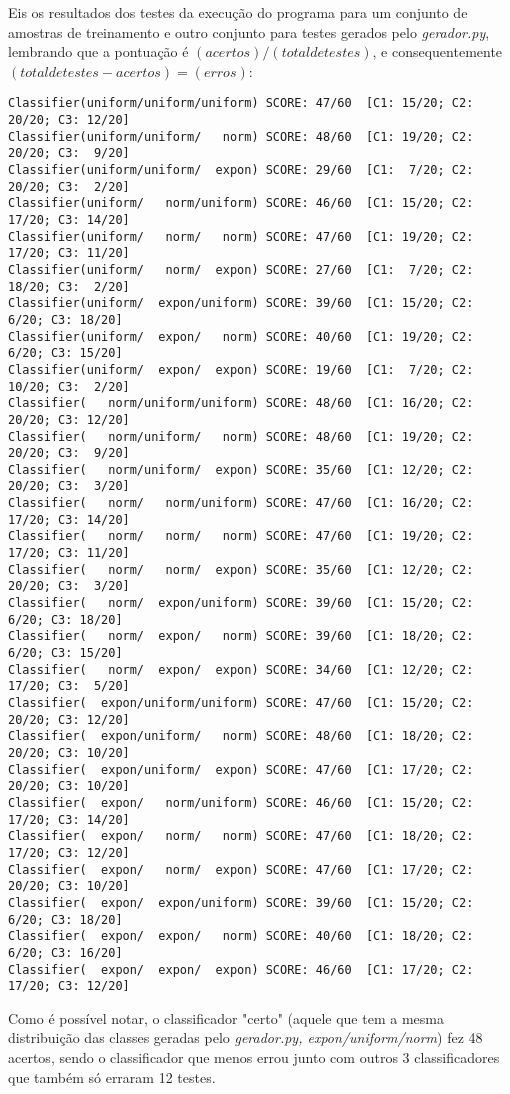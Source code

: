 \documentclass[a4paper,11pt]{article}
\begin{document}
Eis os resultados dos testes da execução do programa para um conjunto de amostras de treinamento e outro conjunto para testes gerados
pelo \textit{gerador.py}, lembrando que a pontuação é $(acertos)/(total de testes)$, e consequentemente $(total de
testes - acertos) = (erros)$:\\
\begin{tiny}
\begin{verbatim}
Classifier(uniform/uniform/uniform)	SCORE: 47/60  [C1: 15/20; C2: 20/20; C3: 12/20]
Classifier(uniform/uniform/   norm)	SCORE: 48/60  [C1: 19/20; C2: 20/20; C3:  9/20]
Classifier(uniform/uniform/  expon)	SCORE: 29/60  [C1:  7/20; C2: 20/20; C3:  2/20]
Classifier(uniform/   norm/uniform)	SCORE: 46/60  [C1: 15/20; C2: 17/20; C3: 14/20]
Classifier(uniform/   norm/   norm)	SCORE: 47/60  [C1: 19/20; C2: 17/20; C3: 11/20]
Classifier(uniform/   norm/  expon)	SCORE: 27/60  [C1:  7/20; C2: 18/20; C3:  2/20]
Classifier(uniform/  expon/uniform)	SCORE: 39/60  [C1: 15/20; C2:  6/20; C3: 18/20]
Classifier(uniform/  expon/   norm)	SCORE: 40/60  [C1: 19/20; C2:  6/20; C3: 15/20]
Classifier(uniform/  expon/  expon)	SCORE: 19/60  [C1:  7/20; C2: 10/20; C3:  2/20]
Classifier(   norm/uniform/uniform)	SCORE: 48/60  [C1: 16/20; C2: 20/20; C3: 12/20]
Classifier(   norm/uniform/   norm)	SCORE: 48/60  [C1: 19/20; C2: 20/20; C3:  9/20]
Classifier(   norm/uniform/  expon)	SCORE: 35/60  [C1: 12/20; C2: 20/20; C3:  3/20]
Classifier(   norm/   norm/uniform)	SCORE: 47/60  [C1: 16/20; C2: 17/20; C3: 14/20]
Classifier(   norm/   norm/   norm)	SCORE: 47/60  [C1: 19/20; C2: 17/20; C3: 11/20]
Classifier(   norm/   norm/  expon)	SCORE: 35/60  [C1: 12/20; C2: 20/20; C3:  3/20]
Classifier(   norm/  expon/uniform)	SCORE: 39/60  [C1: 15/20; C2:  6/20; C3: 18/20]
Classifier(   norm/  expon/   norm)	SCORE: 39/60  [C1: 18/20; C2:  6/20; C3: 15/20]
Classifier(   norm/  expon/  expon)	SCORE: 34/60  [C1: 12/20; C2: 17/20; C3:  5/20]
Classifier(  expon/uniform/uniform)	SCORE: 47/60  [C1: 15/20; C2: 20/20; C3: 12/20]
Classifier(  expon/uniform/   norm)	SCORE: 48/60  [C1: 18/20; C2: 20/20; C3: 10/20]
Classifier(  expon/uniform/  expon)	SCORE: 47/60  [C1: 17/20; C2: 20/20; C3: 10/20]
Classifier(  expon/   norm/uniform)	SCORE: 46/60  [C1: 15/20; C2: 17/20; C3: 14/20]
Classifier(  expon/   norm/   norm)	SCORE: 47/60  [C1: 18/20; C2: 17/20; C3: 12/20]
Classifier(  expon/   norm/  expon)	SCORE: 47/60  [C1: 17/20; C2: 20/20; C3: 10/20]
Classifier(  expon/  expon/uniform)	SCORE: 39/60  [C1: 15/20; C2:  6/20; C3: 18/20]
Classifier(  expon/  expon/   norm)	SCORE: 40/60  [C1: 18/20; C2:  6/20; C3: 16/20]
Classifier(  expon/  expon/  expon)	SCORE: 46/60  [C1: 17/20; C2: 17/20; C3: 12/20]
\end{verbatim}
\end{tiny}

Como é possível notar, o classificador "certo" (aquele que tem a mesma distribuição das classes geradas pelo \textit{gerador.py, expon/uniform/norm})
fez 48 acertos, sendo o classificador que menos errou junto com outros 3 classificadores que também só erraram 12 testes.
\end{document}
